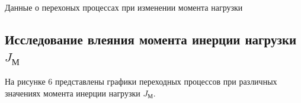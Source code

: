 \documentclass[a4paper, 12pt]{article}
\begin{document}
\begin{table}[h!]
    \centering
    \begin{threeparttable}
        \caption{Данные о перехоных процессах при изменении момента нагрузки}
    \end{threeparttable}
\end{table}

\newpage
\begin{center}
\section{Исследование влеяния момента инерции нагрузки $J_\text{М}$}
\end{center}
На рисунке 6 представлены графики переходных процессов при различных значениях момента инерции нагрузки $J_\text{М}$.
\end{document}
